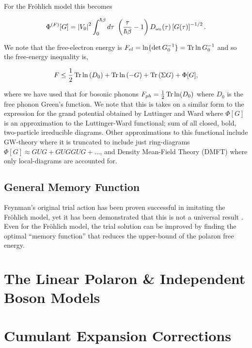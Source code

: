 For the Fr\"ohlich model this becomes

\begin{equation}
    \Phi^{(F)}[G] = \abs{V_0}^2 \int^{\hbar\beta}_0 d\tau\ \left(\frac{\tau}{\hbar\beta} - 1 \right) D_{\omega_0}(\tau) \left[G(\tau)\right]^{-1/2} .
\end{equation}

We note that the free-electron energy is $F_{el} = \ln\{\det G_0^{-1}\} = \Tr \ln G_0^{-1}$ and so the free-energy inequality is,

\begin{equation} \label{eqn:scfreeenergy}
    F \leq \frac{1}{2} \Tr \ln \left( D_0 \right) + \Tr \ln \left(-G\right) + \Tr\left(\Sigma G\right) + \Phi[G],
\end{equation}

where we have used that for bosonic phonons $F_{ph} = \frac{1}{2} \Tr \ln (D_0)$ where $D_0$ is the free phonon Green's function. We note that this is takes on a similar form to the expression for the grand potential obtained by Luttinger and Ward \cite{Luttinger1960} where $\Phi[G]$ is an approximation to the Luttinger-Ward functional; sum of all closed, bold, two-particle irreducible diagrams. Other approximations to this functional include GW-theory where it is truncated to include just ring-diagrams $\Phi[G] \approx GUG + GUGGUG + \dots$, and Density Mean-Field Theory (DMFT) where only local-diagrams are accounted for.

\subsection{General Memory Function}

Feynman's original trial action has been proven successful in imitating the Fr\"ohlich model, yet it has been demonstrated that this is not a universal result \cite{Dries2016, Rosenfelder2001}. Even for the Fr\"ohlich model, the trial solution can be improved by finding the optimal ``memory function'' that reduces the upper-bound of the polaron free energy.

\section{The Linear Polaron \& Independent Boson Models}
\label{sec:chap-fourth-third}

\section{Cumulant Expansion Corrections}
\label{sec:chap-fourth-fourth}